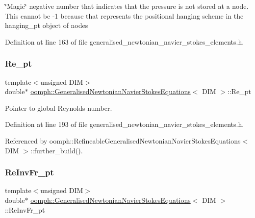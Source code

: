 \char`\"{}\+Magic\char`\"{} negative number that indicates that the pressure is not stored at a node. This cannot be -\/1 because that represents the positional hanging scheme in the hanging\+\_\+pt object of nodes 

Definition at line 163 of file generalised\+\_\+newtonian\+\_\+navier\+\_\+stokes\+\_\+elements.\+h.

\mbox{\label{classoomph_1_1GeneralisedNewtonianNavierStokesEquations_adccaa796179b438e15eb40171b85cc90}} 
\subsubsection{\texorpdfstring{Re\+\_\+pt}{Re\_pt}}
{\footnotesize\ttfamily template$<$unsigned D\+IM$>$ \\
double$\ast$ \hyperlink{classoomph_1_1GeneralisedNewtonianNavierStokesEquations}{oomph\+::\+Generalised\+Newtonian\+Navier\+Stokes\+Equations}$<$ D\+IM $>$\+::Re\+\_\+pt\hspace{0.3cm}{\ttfamily [protected]}}



Pointer to global Reynolds number. 



Definition at line 193 of file generalised\+\_\+newtonian\+\_\+navier\+\_\+stokes\+\_\+elements.\+h.



Referenced by oomph\+::\+Refineable\+Generalised\+Newtonian\+Navier\+Stokes\+Equations$<$ D\+I\+M $>$\+::further\+\_\+build().

\mbox{\label{classoomph_1_1GeneralisedNewtonianNavierStokesEquations_a0c012e6c9b566faa284ac9d321f5271d}} 
\subsubsection{\texorpdfstring{Re\+Inv\+Fr\+\_\+pt}{ReInvFr\_pt}}
{\footnotesize\ttfamily template$<$unsigned D\+IM$>$ \\
double$\ast$ \hyperlink{classoomph_1_1GeneralisedNewtonianNavierStokesEquations}{oomph\+::\+Generalised\+Newtonian\+Navier\+Stokes\+Equations}$<$ D\+IM $>$\+::Re\+Inv\+Fr\+\_\+pt\hspace{0.3cm}{\ttfamily [protected]}}



